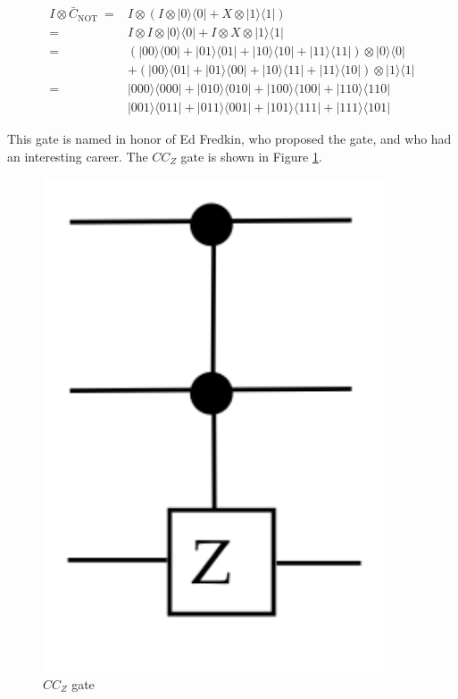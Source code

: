 \documentclass[main.tex]{subfiles}
\begin{document}
    $$
    \begin{aligned}
    I \otimes \bar{C}_{\text {NOT }}=& I \otimes(I \otimes|0\rangle\langle 0|+X \otimes| 1\rangle\langle 1|) \\
    =& I \otimes I \otimes|0\rangle\langle 0|+I \otimes X \otimes| 1\rangle\langle 1| \\
    =&(|00\rangle\langle 00|+| 01\rangle\langle 01|+| 10\rangle\langle 10|+| 11\rangle\langle 11|) \otimes|0\rangle\langle 0| \\
    &+(|00\rangle\langle 01|+| 01\rangle\langle 00|+| 10\rangle\langle 11|+| 11\rangle\langle 10|) \otimes|1\rangle\langle 1| \\
    =&|000\rangle\langle 000|+| 010\rangle\langle 010|+| 100\rangle\langle 100|+| 110\rangle\langle 110| \\
    &|001\rangle\langle 011|+| 011\rangle\langle 001|+| 101\rangle\langle 111|+| 111\rangle\langle 101|
    \end{aligned}
    $$
    
    This gate is named in honor of Ed Fredkin, who proposed the gate, and who had an interesting career. The $CC_{Z}$ gate is shown in Figure \ref{fig:42ccz}.
    
    \begin{figure}
        \centering
        \includegraphics[width=4in]{notes/figs/n08/42ccz.png}
        \caption{$CC_{Z}$ gate}
        \label{fig:42ccz}
    \end{figure}
    
\end{document}
